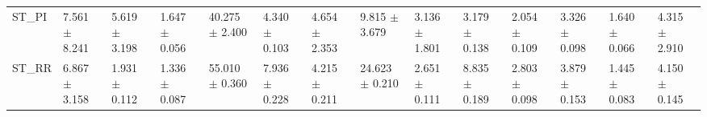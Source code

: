 \begin{tabular}{llllllllllllll}
ST_PI     &   7.561 $ \pm $ 8.241 &  5.619 $ \pm $ 3.198 &  1.647 $ \pm $ 0.056 &   40.275 $ \pm $ 2.400 &   4.340 $ \pm $ 0.103 &   4.654 $ \pm $ 2.353 &   9.815 $ \pm $ 3.679 &   3.136 $ \pm $ 1.801 &   3.179 $ \pm $ 0.138 &  2.054 $ \pm $ 0.109 &   3.326 $ \pm $ 0.098 &  1.640 $ \pm $ 0.066 &   4.315 $ \pm $ 2.910 \\
ST_RR     &   6.867 $ \pm $ 3.158 &  1.931 $ \pm $ 0.112 &  1.336 $ \pm $ 0.087 &   55.010 $ \pm $ 0.360 &   7.936 $ \pm $ 0.228 &   4.215 $ \pm $ 0.211 &  24.623 $ \pm $ 0.210 &   2.651 $ \pm $ 0.111 &   8.835 $ \pm $ 0.189 &  2.803 $ \pm $ 0.098 &   3.879 $ \pm $ 0.153 &  1.445 $ \pm $ 0.083 &   4.150 $ \pm $ 0.145 \\
\bottomrule
\end{tabular}
